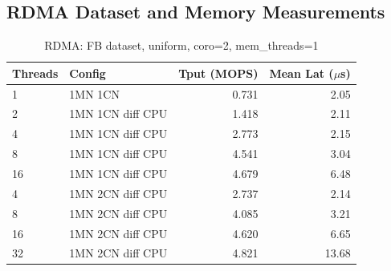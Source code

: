 \documentclass[conference]{IEEEtran}
\begin{document}
\begin{table}[H]
\centering
\caption{9-node coroutine sweep (YCSB-C): throughput (MOPS)\,/\,mean latency ($\mu$s) at MT=1 and MT=2. ``Total T'' = total CN threads across 8 CNs. All coroutine counts converge to the same $\sim$4.5\,MOPS ceiling at 64\,T, confirming client-side bottleneck.}
\label{tab:9node-coro}
\scriptsize
{}
\end{table}

\subsection*{RDMA Dataset and Memory Measurements}

\begin{table}[H]
\centering
\caption{RDMA: FB dataset, uniform, coro=2, mem\_threads=1}
\label{tab:rdma-fb}
\scriptsize
\begin{tabular}{@{}llrr@{}}
\toprule
\textbf{Threads} & \textbf{Config} & \textbf{Tput (MOPS)} & \textbf{Mean Lat ($\mu$s)} \\
\midrule
1  & 1MN 1CN             & 0.731 & 2.05 \\
2  & 1MN 1CN diff CPU    & 1.418 & 2.11 \\
4  & 1MN 1CN diff CPU    & 2.773 & 2.15 \\
8  & 1MN 1CN diff CPU    & 4.541 & 3.04 \\
16 & 1MN 1CN diff CPU    & 4.679 & 6.48 \\
\midrule
4  & 1MN 2CN diff CPU    & 2.737 & 2.14 \\
8  & 1MN 2CN diff CPU    & 4.085 & 3.21 \\
16 & 1MN 2CN diff CPU    & 4.620 & 6.65 \\
32 & 1MN 2CN diff CPU    & 4.821 & 13.68 \\
\bottomrule
\end{tabular}
\end{table}
\end{document}
